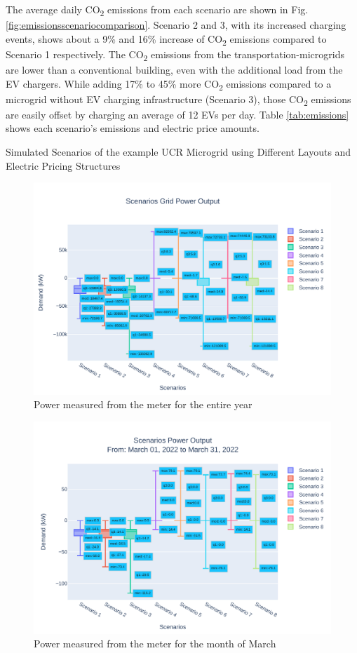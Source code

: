 \documentclass[conference]{IEEEtran}
\begin{document}
		The average daily CO\textsubscript{2} emissions from each scenario are shown in Fig. \ref{fig:emissionsscenariocomparison}. Scenario 2 and 3, with its increased charging events, shows about a 9\%  and 16\% increase of CO\textsubscript{2} emissions compared to Scenario 1 respectively. The CO\textsubscript{2} emissions from the transportation-microgrids are lower than a conventional building, even with the additional load from the EV chargers. While adding 17\% to 45\% more CO\textsubscript{2} emissions compared to a microgrid without EV charging infrastructure (Scenario 3), those CO\textsubscript{2} emissions are easily offset by charging an average of 12 EVs per day. Table \ref{tab:emissions} shows each scenario's emissions and electric price amounts.
	\begin{table}
		\caption{Simulated Scenarios of the example UCR Microgrid using Different Layouts and Electric Pricing Structures}
		\tiny
		
		\normalsize
		\label{tab:scenarios}
	\end{table}
	\begin{figure}
		\centering
		\includegraphics[width=0.9\linewidth]{Fig/Option_3/scenarios_power_output_boxplot}
		\caption{Power measured from the meter for the entire year}
		\label{fig:scenariospoweroutputboxplot}
	\end{figure}
	\begin{figure}
		\centering
		\includegraphics[width=0.9\linewidth]{Fig/Option_3/0_Scn_Output_Run_3_Mar_01_2022_to_Mar_31_2022}
		\caption{\footnotesize  Power measured from the meter for the month of March}
		\label{fig:0scnoutputrun2mar012022tomar312022}
	\end{figure}
\end{document}

